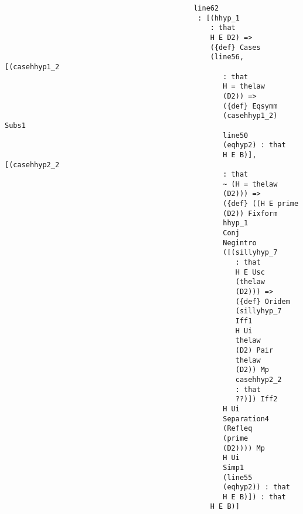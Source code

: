 \documentclass[12pt]{article}
\begin{document}
\begin{verbatim}
                                             line62 
                                              : [(hhyp_1 
                                                 : that 
                                                 H E D2) => 
                                                 ({def} Cases 
                                                 (line56, [(casehhyp1_2 
                                                    : that 
                                                    H = thelaw 
                                                    (D2)) => 
                                                    ({def} Eqsymm 
                                                    (casehhyp1_2) Subs1 
                                                    line50 
                                                    (eqhyp2) : that 
                                                    H E B)], [(casehhyp2_2 
                                                    : that 
                                                    ~ (H = thelaw 
                                                    (D2))) => 
                                                    ({def} ((H E prime 
                                                    (D2)) Fixform 
                                                    hhyp_1 
                                                    Conj 
                                                    Negintro 
                                                    ([(sillyhyp_7 
                                                       : that 
                                                       H E Usc 
                                                       (thelaw 
                                                       (D2))) => 
                                                       ({def} Oridem 
                                                       (sillyhyp_7 
                                                       Iff1 
                                                       H Ui 
                                                       thelaw 
                                                       (D2) Pair 
                                                       thelaw 
                                                       (D2)) Mp 
                                                       casehhyp2_2 
                                                       : that 
                                                       ??)]) Iff2 
                                                    H Ui 
                                                    Separation4 
                                                    (Refleq 
                                                    (prime 
                                                    (D2)))) Mp 
                                                    H Ui 
                                                    Simp1 
                                                    (line55 
                                                    (eqhyp2)) : that 
                                                    H E B)]) : that 
                                                 H E B)]



\end{verbatim}
\end{document}
